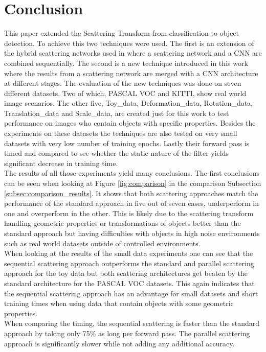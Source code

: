 \chapter{Conclusion}
\label{chap:conclusion}

This paper extended the Scattering Transform from classification to object detection. To achieve this two techniques were used. The first is an extension of the hybrid scattering networks used in \cite{ScalingTheScatteringTransform2017} where a scattering network and a CNN are combined sequentially. The second is a new technique introduced in this work where the results from a scattering network are merged with a CNN architecture at different stages. The evaluation of the new techniques was done on seven different datasets. Two of which, PASCAL VOC and KITTI, show real world image scenarios. The other five, Toy\_data, Deformation\_data, Rotation\_data, Translation\_data and Scale\_data, are created just for this work to test performance on images who contain objects with specific properties. Besides the experiments on these datasets the techniques are also tested on very small datasets with very low number of training epochs. Lastly their forward pass is timed and compared to see whether the static nature of the filter yields significant decrease in training time. \\
The results of all those experiments yield many conclusions. The first conclusions can be seen when looking at Figure \ref{fig:comparison} in the comparison Subsection \ref{subsec:comparison_results}. It shows that both scattering approaches match the performance of the standard approach in five out of seven cases, underperform in one and overperform in the other. This is likely due to the scattering transform handling geometric properties or transformations of objects better than the standard approach but having difficulties with objects in high noise environments such as real world datasets outside of controlled environments. \\
When looking at the results of the small data experiments one can see that the sequential scattering approach outperforms the standard and parallel scattering approach for the toy data but both scattering architectures get beaten by the standard architecture for the PASCAL VOC datasets. This again indicates that the sequential scattering approach has an advantage for small datasets and short training times when using data that contain objects with some geometric properties. \\
When comparing the timing, the sequential scattering is faster than the standard approach by taking only 75\% as long per forward pass. The parallel scattering approach is significantly slower while not adding any additional accuracy.\\
